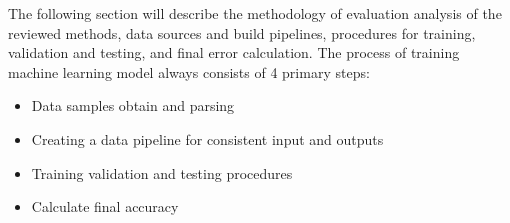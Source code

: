 The following section will describe the methodology of evaluation analysis of the reviewed methods, data sources and build pipelines, procedures for training, validation and testing, and final error calculation.
The process of training machine learning model always consists of 4 primary steps:
\begin{itemize}
    \item Data samples obtain and parsing\\
    \item Creating a data pipeline for consistent input and outputs\\
    \item Training validation and testing procedures\\
    \item Calculate final accuracy\\
\end{itemize}

